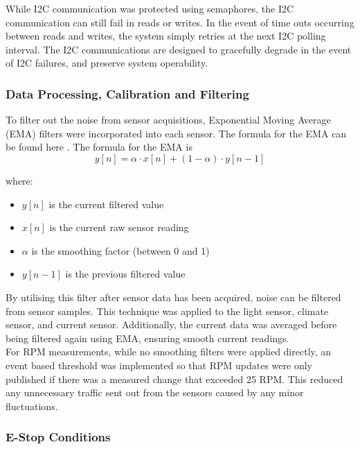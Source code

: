 \documentclass[a4paper, 11pt, titlepage]{article}
\begin{document}
While I2C communication was protected using semaphores, the I2C communication can still fail in reads or writes. In the event of time outs occurring between reads and writes, the system simply retries at the next I2C polling interval. The I2C communications are designed to gracefully degrade in the event of I2C failures, and preserve system operability.\\


\subsubsection{Data Processing, Calibration and Filtering}

 To filter out the noise from sensor acquisitions, Exponential Moving Average (EMA) filters were incorporated into each sensor. The formula for the EMA can be found here \parencite{hunter}. The formula for the EMA is \begin{equation}
    y[n] = \alpha \cdot x[n] + (1 - \alpha) \cdot y[n-1]
\end{equation}

where:

\begin{itemize}
    \item $y[n]$ is the current filtered value
    \item $x[n]$ is the current raw sensor reading
    \item $\alpha$ is the smoothing factor (between 0 and 1)
    \item $y[n-1]$ is the previous filtered value
\end{itemize}
    
By utilising this filter after sensor data has been acquired, noise can be filtered from sensor samples. This technique was applied to the light sensor, climate sensor, and current sensor. Additionally, the current data was averaged before being filtered again using EMA, ensuring smooth current readings.\\

For RPM measurements, while no smoothing filters were applied directly, an event based threshold was implemented so that RPM updates were only published if there was a measured change that exceeded 25 RPM. This reduced any unnecessary traffic sent out from the sensors caused by any minor fluctuations.

\subsubsection{E-Stop Conditions}
\end{document}
